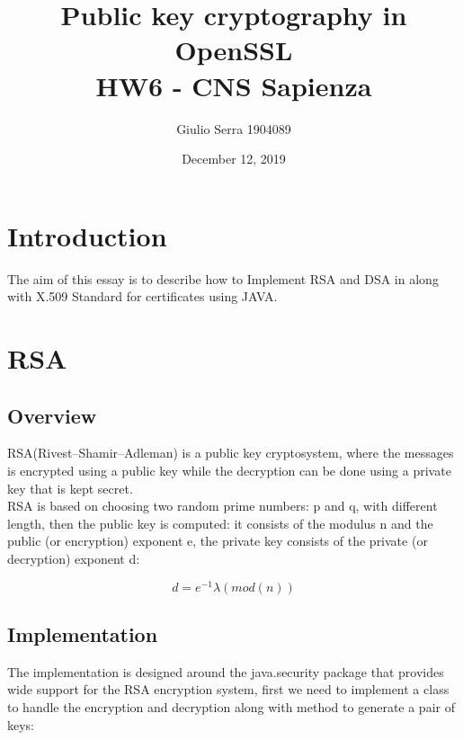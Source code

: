 \documentclass{article}
\begin{document}
\pagecolor{white}

\title{%
  Public key cryptography in OpenSSL \\
  \large HW6 - CNS Sapienza}

\author{Giulio Serra 1904089}
\date{December 12, 2019}

\maketitle

\begin{titlepage}
\end{titlepage}

\tableofcontents

\begin{titlepage}
\end{titlepage}

\section{Introduction}\label{sec:intro}
The aim of this essay is to describe how to Implement RSA and DSA in along with X.509 Standard for certificates using JAVA.

\section{RSA}

\subsection{Overview}

RSA(Rivest–Shamir–Adleman) is a public key cryptosystem, where the messages is encrypted using a public key while the decryption can be done using a private key that is kept secret.\\
RSA is based on choosing two random prime numbers: p and q, with different length, then the public key is computed: it consists of the modulus n and the public (or encryption) exponent e, the private key consists of the private (or decryption) exponent d:

\[d= e^{-1} \lambda (mod(n))\]

\subsection{Implementation}

The implementation is designed around the java.security package that provides wide support for the RSA encryption system, first we need to implement a class to handle the encryption and decryption along with method to generate a pair of keys:
\end{document}
